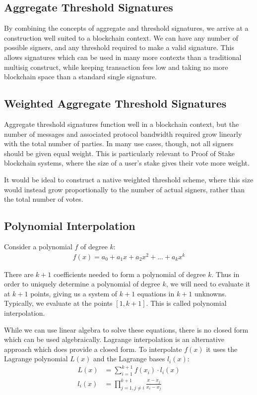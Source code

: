\documentclass{article}
\theoremstyle{plain}
\theoremstyle{definition}
\theoremstyle{remark}
\begin{document}
\subsection{
  Aggregate Threshold Signatures
}

By combining the concepts of aggregate and threshold signatures, we arrive at a construction well suited to a blockchain context.  We can have any number of possible signers, and any threshold required to make a valid signature.  This allows signatures which can be used in many more contexts than a traditional multisig construct, while keeping transaction fees low and taking no more blockchain space than a standard single signature.

\subsection{
  Weighted Aggregate Threshold Signatures
}

Aggregate threshold signatures function well in a blockchain context, but the number of messages and associated protocol bandwidth required grow linearly with the total number of parties.  In many use cases, though, not all signers should be given equal weight.  This is particularly relevant to Proof of Stake blockchain systems, where the size of a user's stake gives their vote more weight.

It would be ideal to construct a native weighted threshold scheme, where this size would instead grow proportionally to the number of actual signers, rather than the total number of votes.  

\subsection{
  Polynomial Interpolation
}

Consider a polynomial $f$ of degree $k$:
\begin{align}
  f(x) = a_0 + a_1 x + a_2 x^2 + ... + a_k x^k\nonumber
\end{align}

There are $k+1$ coefficients needed to form a polynomial of degree $k$.  Thus in order to uniquely determine a polynomial of degree $k$, we will need to evaluate it at $k+1$ points, giving us a system of $k+1$ equations in $k+1$ unknowns.  Typically, we evaluate at the points $[1, k+1]$.  This is called polynomial interpolation.

While we can use linear algebra to solve these equations, there is no closed form which can be used algebraically.  Lagrange interpolation \cite{lagrange} is an alternative approach which does provide a closed form.  To interpolate $f(x)$ it uses the Lagrange polynomial $L(x)$ and the Lagrange bases $l_i(x)$:
\begin{align}
  L(x) &= \sum_{i=1}^{k+1} f(x_i) \cdot l_i(x)\\
  l_i(x) &= \prod_{j=1, j \neq i}^{k+1} \frac{x - x_j}{x_i - x_j}
\end{align}
\end{document}
